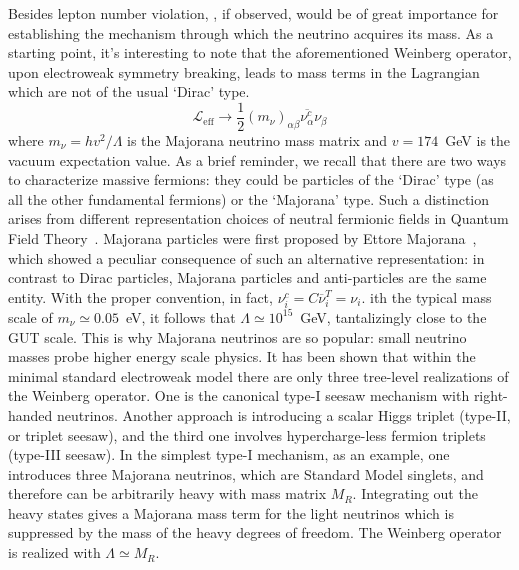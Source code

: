 Besides lepton number violation, \onbb, if observed, would be of great
importance for establishing the mechanism through which the neutrino acquires
its mass. As a starting point, it's interesting to note that the aforementioned
Weinberg operator, upon electroweak symmetry breaking, leads to mass terms in
the Lagrangian which are not of the usual `Dirac' type.
\begin{equation}\label{eq:nbb:wein-sb}
  \mathcal{L}_\text{eff} \longrightarrow \frac{1}{2} {(m_\nu)}_{\alpha\beta}
                                         \overline{\nu_\alpha^c} \nu_\beta
\end{equation}
where $m_\nu = h v^2 / \Lambda$ is the Majorana neutrino mass matrix and $v =
174$~GeV is the vacuum expectation value.  As a brief reminder, we recall that
there are two ways to characterize massive fermions: they could be particles of
the `Dirac' type (as all the other fundamental fermions) or the `Majorana'
type.  Such a distinction arises from different representation choices of
neutral fermionic fields in Quantum Field Theory~\cite{Giunti2007}.  Majorana
particles were first proposed by Ettore Majorana~\cite{Majorana1932}, which
showed a peculiar consequence of such an alternative representation: in
contrast to Dirac particles, Majorana particles and anti-particles are the same
entity. With the proper convention, in fact, $\nu_i^c = C\overline{\nu}^T_i = \nu_i$.
ith the typical mass scale of $m_\nu \simeq 0.05$~eV, it follows that
$\Lambda \simeq 10^{15}$~GeV, tantalizingly close to the GUT scale. This is why
Majorana neutrinos are so popular: small neutrino masses probe higher energy
scale physics. It has been shown that within the minimal standard electroweak
model there are only three tree-level realizations of the Weinberg operator.
One is the canonical type-I seesaw mechanism with right-handed neutrinos.
Another approach is introducing a scalar Higgs triplet (type-II, or triplet
seesaw), and the third one involves hypercharge-less fermion triplets (type-III
seesaw).  In the simplest type-I mechanism, as an example, one introduces three
Majorana neutrinos, which are Standard Model singlets, and therefore can be
arbitrarily heavy with mass matrix $M_R$. Integrating out the heavy states
gives a Majorana mass term for the light neutrinos which is suppressed by the
mass of the heavy degrees of freedom. The Weinberg operator is realized with
$\Lambda \simeq M_R$.


